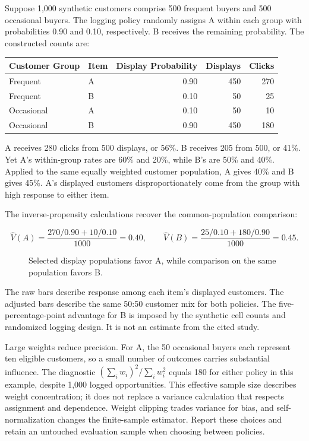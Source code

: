 \noindent Suppose 1,000 synthetic customers comprise 500 frequent buyers and 500
occasional buyers. The logging policy randomly assigns A within each
group with probabilities 0.90 and 0.10, respectively. B receives the
remaining probability. The constructed counts are:

\begin{table}[H]
\centering\small
\begin{tabular}{@{}llrrr@{}}
\toprule
Customer Group & Item & Display Probability & Displays & Clicks \\
\midrule

Frequent & A & 0.90 & 450 & 270 \\
Frequent & B & 0.10 & 50 & 25 \\
Occasional & A & 0.10 & 50 & 10 \\
Occasional & B & 0.90 & 450 & 180 \\
\bottomrule
\end{tabular}
\end{table}

A receives 280 clicks from 500 displays, or 56\%. B receives 205 from
500, or 41\%. Yet A's within-group rates are 60\% and 20\%, while B's
are 50\% and 40\%. Applied to the same equally weighted customer
population, A gives 40\% and B gives 45\%. A's displayed customers
disproportionately come from the group with high response to either
item.

The inverse-propensity calculations recover the common-population
comparison:

\[
\widehat V(A)=\frac{270/0.90+10/0.10}{1000}=0.40,
\qquad
\widehat V(B)=\frac{25/0.10+180/0.90}{1000}=0.45.
\]

\begin{figure}[htbp]
\centering

\caption{Selected display populations favor A, while comparison on the same population favors B.}\label{fig:M06_exposure_reversal}
\end{figure}

The raw bars describe response among each item's displayed customers.
The adjusted bars describe the same 50:50 customer mix for both
policies. The five-percentage-point advantage for B is imposed by the
synthetic cell counts and randomized logging design. It is not an
estimate from the cited study.

Large weights reduce precision. For A, the 50 occasional buyers each
represent ten eligible customers, so a small number of outcomes carries
substantial influence. The diagnostic \((\sum_i w_i)^2/\sum_i w_i^2\)
equals 180 for either policy in this example, despite 1,000 logged
opportunities. This effective sample size describes weight
concentration; it does not replace a variance calculation that respects
assignment and dependence. Weight clipping trades variance for bias, and
self-normalization changes the finite-sample estimator. Report these
choices and retain an untouched evaluation sample when choosing between
policies.

